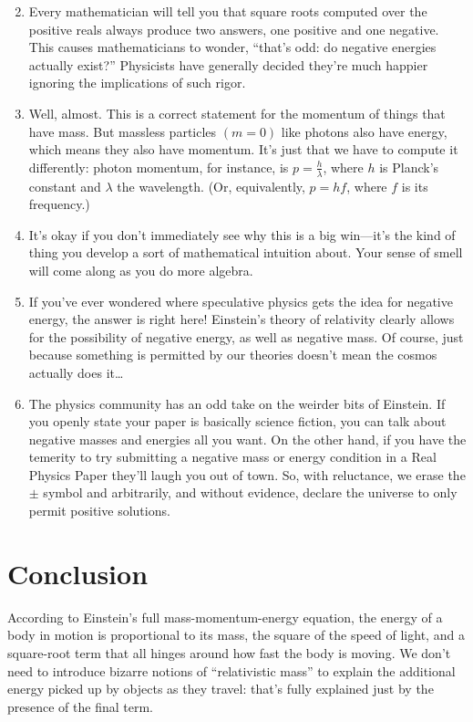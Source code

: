 \documentclass[10pt,letterpaper,oneside,notitlepage]{article}
\begin{document}
\begin{enumerate}
  \setcounter{enumi}{1}
  \item
  Every mathematician will tell you that square roots computed over the
  positive reals always produce two answers, one positive and one negative.
  This causes mathematicians to wonder, ``that's odd: do negative energies
  actually exist?'' Physicists have generally decided they're much 
  happier ignoring the implications of such rigor.
  \setcounter{enumi}{3}
  \item
  Well, almost. This is a correct statement for the momentum of things
  that have mass. But massless particles $\left(m = 0\right)$ like photons also
  have energy, which means they also have momentum. It's just that we
  have to compute it differently: photon momentum, for instance, is
  $p = \frac{h}{\lambda}$, where $h$ is Planck's constant and $\lambda$
  the wavelength. (Or, equivalently, $p = hf$, where $f$ is its
  frequency.)
  \setcounter{enumi}{7}
  \item
  It's okay if you don't immediately see why this is a
  big win---it's the kind of thing you develop a sort of mathematical
  intuition about. Your sense of smell will come along as you do more
  algebra.
  \setcounter{enumi}{16}
  \item
  If you've ever wondered where speculative physics gets
  the idea for negative energy, the answer is right here! Einstein's
  theory of relativity clearly allows for the possibility of negative
  energy, as well as negative mass. Of course, just because something
  is permitted by our theories doesn't mean the cosmos actually does
  it\ldots
  \item
  The physics community has an
  odd take on the weirder bits of Einstein. If you openly state your 
  paper is basically science fiction, you can talk about negative masses
  and energies all you want. On the other hand, if you have the temerity 
  to try submitting a negative mass or energy condition in a Real Physics
  Paper they'll laugh you out of town. So, with reluctance, we erase the
  $\pm$ symbol and arbitrarily, and without evidence, declare the universe
  to only permit positive solutions.
\end{enumerate}

\section{Conclusion}
According to Einstein's full mass-momentum-energy equation, the energy
of a body in motion is proportional to its mass, the square of the speed
of light, and a square-root term that all hinges around how fast the body
is moving. We don't need to introduce bizarre notions of ``relativistic
mass'' to explain the additional energy picked up by objects as they
travel: that's fully explained just by the presence of the final term.
\end{document}
